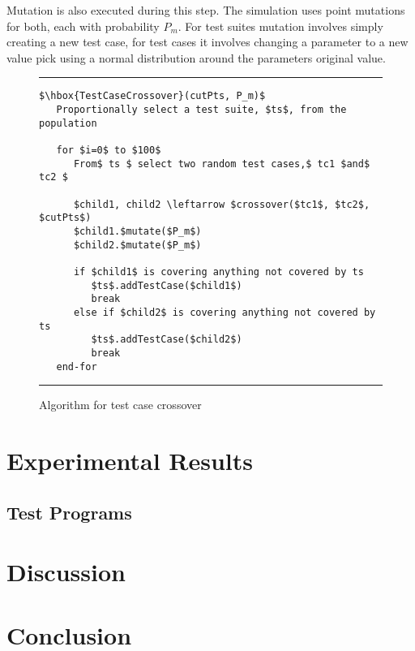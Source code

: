\documentclass[runningheads]{llncs}
\begin{document}
Mutation is also executed during this step. The simulation uses point mutations for both, each with probability $P_m$. For test suites mutation involves simply creating a new test case, for test cases it involves changing a parameter to a new value pick using a normal distribution around the parameters original value. 

\begin{figure}[h!]
\begin{center}
\hrule
\medskip
\begin{Verbatim}[fontfamily=tt, xleftmargin=10pt, commandchars=\\\{\},
		codes={\catcode`$=3\catcode`^=7\catcode`_=8}]
$\hbox{TestCaseCrossover}(cutPts, P_m)$  
   Proportionally select a test suite, $ts$, from the population

   for $i=0$ to $100$
      From$ ts $ select two random test cases,$ tc1 $and$ tc2 $

      $child1, child2 \leftarrow $crossover($tc1$, $tc2$, $cutPts$)
      $child1.$mutate($P_m$)
      $child2.$mutate($P_m$)

      if $child1$ is covering anything not covered by ts
         $ts$.addTestCase($child1$)
         break
      else if $child2$ is covering anything not covered by ts
         $ts$.addTestCase($child2$)
         break
   end-for
\end{Verbatim}
\hrule
\end{center}
\caption{Algorithm for test case crossover \label{fig:tcCross}}
\end{figure}



\FloatBarrier
\newpage

\section{Experimental Results}
\subsection{Test Programs}



\newpage
\section{Discussion}

\newpage
\section{Conclusion}
\end{document}
